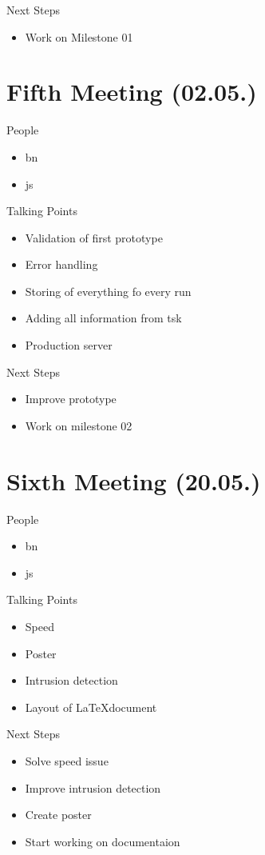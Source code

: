 Next Steps
\begin{itemize}
    \item Work on Milestone 01
\end{itemize}

\section{Fifth Meeting (02.05.)}
\label{sec:meeting05}

People
\begin{itemize}
    \item \gls{bn}
    \item \gls{js}
\end{itemize}

Talking Points
\begin{itemize}
    \item Validation of first prototype
    \item Error handling
    \item Storing of everything fo every run
    \item Adding all information from \gls{tsk}
    \item Production server
\end{itemize}

Next Steps
\begin{itemize}
    \item Improve prototype
    \item Work on milestone 02
\end{itemize}

\section{Sixth Meeting (20.05.)}
\label{sec:meeting06}

People
\begin{itemize}
    \item \gls{bn}
    \item \gls{js}
\end{itemize}

Talking Points
\begin{itemize}
    \item Speed
    \item Poster
    \item Intrusion detection 
    \item Layout of \LaTeX document
\end{itemize}

Next Steps
\begin{itemize}
    \item Solve speed issue
    \item Improve intrusion detection
    \item Create poster
    \item Start working on documentaion
\end{itemize}

